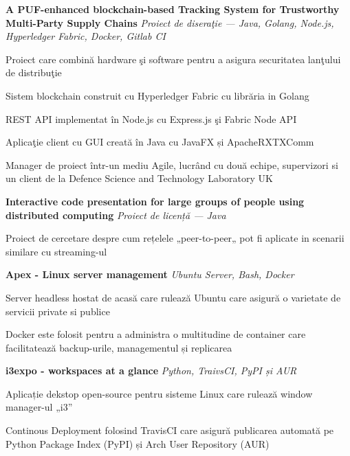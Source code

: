 
\bigskip
{}%
\textbf{A PUF-enhanced blockchain-based Tracking System for Trustworthy Multi-Party Supply Chains} \newline
\emph{Proiect de diseraţie --- Java, Golang, Node.js, Hyperledger Fabric, Docker, Gitlab CI} %
\begin{itemize*}
  \item Proiect care combină hardware şi software pentru a asigura securitatea lanţului de distribuţie
  \item Sistem blockchain construit cu Hyperledger Fabric cu librăria in Golang
  \item REST API implementat în Node.js cu Express.js şi Fabric Node API
  \item Aplicaţie client cu GUI creată în Java cu JavaFX și ApacheRXTXComm
  \item Manager de proiect într-un mediu Agile, lucrând cu două echipe, supervizori si un client de la Defence Science and Technology Laboratory UK
\end{itemize*}

\smallskip
\textbf{Interactive code presentation for large groups of people using distributed computing} \newline
\emph{Proiect de licență --- Java} %
\begin{itemize*}
  \item Proiect de cercetare despre cum rețelele „peer-to-peer„ pot fi aplicate in scenarii similare cu streaming-ul
\end{itemize*}

\smallskip
\textbf{Apex - Linux server management}\newline
\small{\emph{Ubuntu Server, Bash, Docker}}
\begin{itemize*}
  \item Server headless hostat de acasă care rulează Ubuntu care asigură o varietate de servicii private si publice
  \item Docker este folosit pentru a administra o multitudine de container care facilitatează backup-urile, managementul și replicarea
\end{itemize*}

\smallskip
\textbf{i3expo - workspaces at a glance}\newline
\small{\emph{Python, TraivsCI, PyPI și AUR}}
\begin{itemize*}
  \item Aplicație dekstop open-source pentru sisteme Linux care rulează window manager-ul „i3”
  \item Continous Deployment folosind TravisCI care asigură publicarea automată pe Python Package Index (PyPI) și Arch User Repository (AUR)
\end{itemize*}